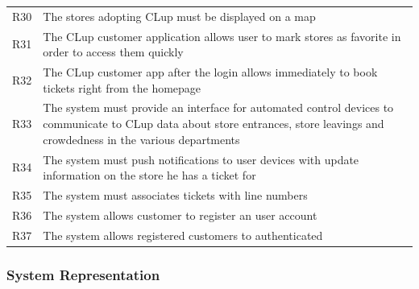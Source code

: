 \begin{tabular}{C{1cm}L{14.1cm}}
    R30   & The stores adopting CLup must be displayed on a map                                                                                                                             \\
    R31   & The CLup customer application allows user to mark stores as favorite in order to access them quickly                                                                            \\
    R32   & The CLup customer app after the login allows immediately to book tickets right from the homepage                                                                                \\
    R33   & The system must provide an interface for automated control devices to communicate to CLup data about store entrances, store leavings and crowdedness in the various departments \\
    R34   & The system must push notifications to user devices with update information on the store he has a ticket for                                                                     \\
    R35  & The system must associates tickets with line numbers                                                                                                                            \\
    R36  & The system allows customer to register an user account \\
    R37  & The system allows registered customers to authenticated \\
\end{tabular}
\vfill

\subsubsection{System Representation}



